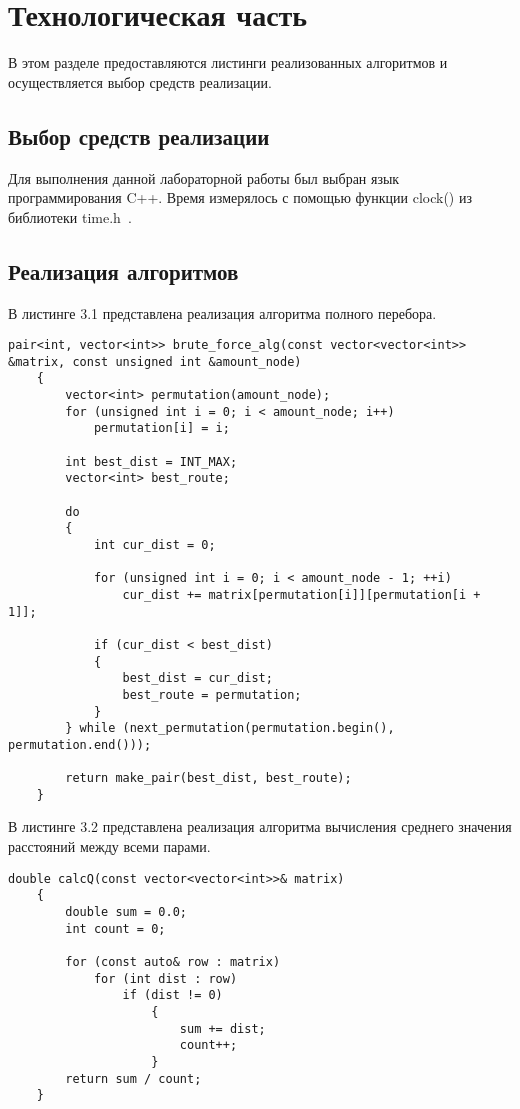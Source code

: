 \chapter{Технологическая часть}

В этом разделе предоставляются листинги реализованных алгоритмов и
осуществляется выбор средств реализации.

\section{Выбор средств реализации}

Для выполнения данной лабораторной работы был выбран язык программирования C++. 
Время измерялось с помощью функции clock() из библиотеки time.h~\cite{clock_t}.

\section{Реализация алгоритмов}

В листинге 3.1 представлена реализация алгоритма полного перебора.

\begin{lstlisting}[caption=Алгоритм полного перебора]
	pair<int, vector<int>> brute_force_alg(const vector<vector<int>> &matrix, const unsigned int &amount_node) 
	{
		vector<int> permutation(amount_node);
		for (unsigned int i = 0; i < amount_node; i++)
			permutation[i] = i;
		
		int best_dist = INT_MAX;
		vector<int> best_route;
		
		do 
		{
			int cur_dist = 0;
			
			for (unsigned int i = 0; i < amount_node - 1; ++i)
				cur_dist += matrix[permutation[i]][permutation[i + 1]];
			
			if (cur_dist < best_dist) 
			{
				best_dist = cur_dist;
				best_route = permutation;
			}
		} while (next_permutation(permutation.begin(), permutation.end())); 
		
		return make_pair(best_dist, best_route);
	}
\end{lstlisting}

В листинге 3.2 представлена реализация алгоритма вычисления среднего значения расстояний между всеми парами.

\begin{lstlisting}[caption=Алгоритм вычисления среднего значения расстояний между всеми парами]
	double calcQ(const vector<vector<int>>& matrix) 
	{
		double sum = 0.0;
		int count = 0;
		
		for (const auto& row : matrix)
			for (int dist : row)
				if (dist != 0) 
					{
						sum += dist;
						count++;
					}
		return sum / count;
	}
\end{lstlisting}

